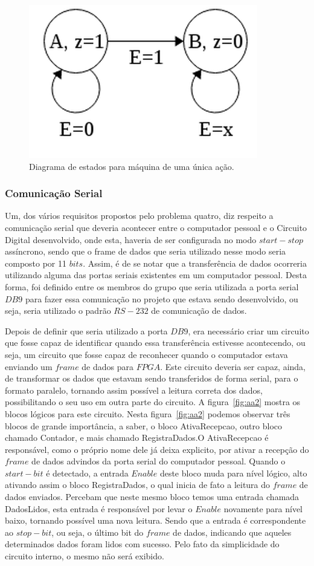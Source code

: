 \documentclass[12pt]{article}
\begin{document}
\begin{figure}[h]
\centering
\includegraphics[width=.3\textwidth]{img/p4/fsm.png}
\caption{Diagrama de estados para máquina de uma única ação.}
\label{fig:fsm}
\end{figure}


\subsubsection{Comunicação Serial}

Um, dos vários requisitos propostos pelo problema quatro, diz respeito a comunicação serial que deveria acontecer entre o computador pessoal e o Circuito Digital desenvolvido, onde esta, haveria de ser configurada no modo $start-stop$ assíncrono, sendo que o frame de dados que seria utilizado nesse modo seria composto por 11 $bits$. Assim, é de se notar que a transferência de dados ocorreria utilizando alguma das portas seriais existentes em um computador pessoal. Desta forma, foi definido entre os membros do grupo que seria utilizada a porta serial $DB9$ para fazer essa comunicação no projeto que estava sendo desenvolvido, ou seja, seria utilizado o padrão $RS-232$ de comunicação de dados.

Depois de definir que seria utilizado a porta $DB9$, era necessário criar um circuito que fosse capaz de identificar quando essa transferência estivesse acontecendo, ou seja, um circuito que fosse capaz de reconhecer quando o computador estava enviando um $frame$ de dados para $FPGA$. Este circuito deveria ser capaz, ainda, de transformar os dados que estavam sendo transferidos de forma serial, para o formato paralelo, tornando assim possível a leitura correta dos dados, possibilitando o seu uso em outra parte do circuito. A figura~\ref{fig:aa2} mostra os blocos lógicos para este circuito. Nesta figura~\ref{fig:aa2} podemos observar três blocos de grande importância, a saber, o bloco AtivaRecepcao, outro bloco chamado Contador, e mais chamado RegistraDados.O AtivaRecepcao é responsável, como o próprio nome dele já deixa explicito, por ativar a recepção do $frame$ de dados advindos da porta serial do computador pessoal. Quando o $start-bit$ é detectado, a entrada $Enable$ deste bloco muda para nível lógico, alto ativando assim o bloco RegistraDados, o qual inicia de fato a leitura do $frame$ de dados enviados. Percebam que neste mesmo bloco temos uma entrada chamada DadosLidos, esta entrada é responsável por levar o $Enable$ novamente para nível baixo, tornando possível uma nova leitura. Sendo que a entrada é correspondente ao $stop-bit$, ou seja, o último bit do $frame$ de dados, indicando que aqueles determinados dados foram lidos com sucesso. Pelo fato da simplicidade do circuito interno, o mesmo não será exibido. 
\end{document}
